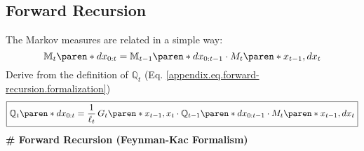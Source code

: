 \subsection{Forward Recursion}
%
The Markov measures are related in a simple way:
%
\begin{equation}
    \mathbb{M}_{t} \paren*{dx_{0:t}} =
        \mathbb{M}_{t-1} \paren*{dx_{0:t-1}} \cdot
        M_{t} \paren*{x_{t-1}, dx_{t}}
\end{equation}
%
Derive from the definition of $\mathbb{Q}_{t}$ (Eq. \eqref{appendix.eq.forward-recursion.formalization})
%
\begin{equation}
    \boxed{
        \mathbb{Q}_{t} \paren*{dx_{0:t}} =
            \dfrac{1}{\ell_{t}} \,
            G_{t} \paren*{x_{t - 1}, x_{t}}
            \cdot \mathbb{Q}_{t-1} \paren*{dx_{0:t-1}}
            \cdot M_{t} \paren*{x_{t-1}, dx_{t}}
    }
\end{equation}
%
\textbf{\# Forward Recursion (Feynman-Kac Formalism)}


